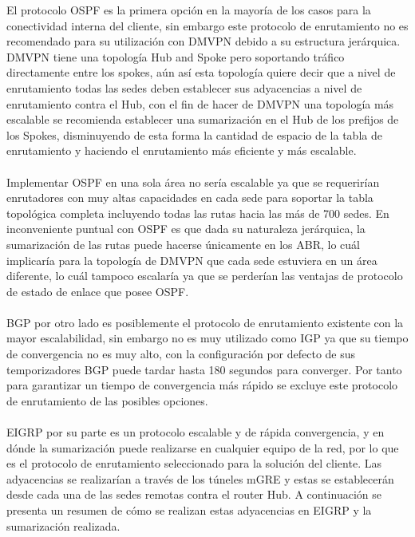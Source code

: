 El protocolo OSPF es la primera opción en la mayoría de los casos para la conectividad interna del cliente, sin embargo este protocolo de enrutamiento no es recomendado para su utilización con DMVPN debido a su estructura jerárquica. DMVPN tiene una topología Hub and Spoke pero soportando tráfico directamente entre los spokes, aún así esta topología quiere decir que a nivel de enrutamiento todas las sedes deben establecer sus adyacencias a nivel de enrutamiento contra el Hub, con el fin de hacer de DMVPN una topología más escalable se recomienda establecer una sumarización en el Hub de los prefijos de los Spokes, disminuyendo de esta forma la cantidad de espacio de la tabla de enrutamiento y haciendo el enrutamiento más eficiente y más escalable.
\\
\\
Implementar OSPF en una sola área no sería escalable ya que se requerirían enrutadores con muy altas capacidades en cada sede para soportar la tabla topológica completa incluyendo todas las rutas hacia las más de 700 sedes. En inconveniente puntual con OSPF es que dada su naturaleza jerárquica, la sumarización de las rutas puede hacerse únicamente en los ABR, lo cuál implicaría para la topología de DMVPN que cada sede estuviera en un área diferente, lo cuál tampoco escalaría ya que se perderían las ventajas de protocolo de estado de enlace que posee OSPF.
\\
\\
BGP por otro lado es posiblemente el protocolo de enrutamiento existente con la mayor escalabilidad, sin embargo no es muy utilizado como IGP ya que su tiempo de convergencia no es muy alto, con la configuración por defecto de sus temporizadores BGP puede tardar hasta 180 segundos para converger. Por tanto para garantizar un tiempo de convergencia más rápido se excluye este protocolo de enrutamiento de las posibles opciones.
\\
\\
EIGRP por su parte es un protocolo escalable y de rápida convergencia, y en dónde la sumarización puede realizarse en cualquier equipo de la red, por lo que es el protocolo de enrutamiento seleccionado para la solución del cliente. Las adyacencias se realizarían a través de los túneles mGRE y estas se establecerán desde cada una de las sedes remotas contra el router Hub. A continuación se presenta un resumen de cómo se realizan estas adyacencias en EIGRP y la sumarización realizada.
